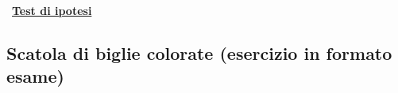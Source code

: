 \documentclass[11pt,openany]{book}
\begin{document}

\clearpage\
\hfill\textbf{{\color{brown}\hyperref[test_ipotesi]{Test di ipotesi \faShare}}}
\subsection{Scatola di biglie colorate (esercizio in formato esame)}
\label{Scatola di biglie colorate}
\end{document}
